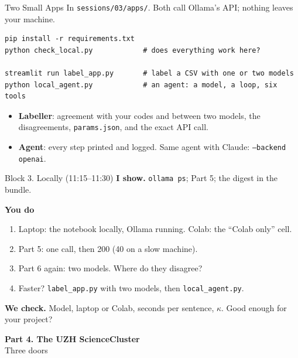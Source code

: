 \documentclass[svgnames,x11names,dvipsnames]{beamer}
\newcommand{\chg}[1]{{\bfseries #1}}
\renewcommand{\chg}[1]{#1}
\newcommand{\sectionslide}[2]{%
\begin{frame}[plain]
  \centering
  \vfill
  {\LARGE \textbf{\textcolor{titleblue}{#1}}}\\[0.4cm]
  {#2}
  \vfill
\end{frame}}
\begin{document}
\begin{frame}[fragile]{\chg{Two Small Apps}}
\small
In \texttt{sessions/03/apps/}. Both call Ollama's API; nothing leaves your machine.

\vspace{0.3cm}
{\scriptsize
\begin{verbatim}
pip install -r requirements.txt
python check_local.py            # does everything work here?

streamlit run label_app.py       # label a CSV with one or two models
python local_agent.py            # an agent: a model, a loop, six tools
\end{verbatim}}

\vspace{0.2cm}
\begin{itemize}
    \setlength{\itemsep}{4pt}
    \item \textbf{Labeller}: agreement with your codes and between two models, the disagreements, \texttt{params.json}, and the exact API call.
    \item \textbf{Agent}: every step printed and logged. Same agent with Claude: \texttt{--backend openai}.
\end{itemize}
\end{frame}

\begin{frame}{Block 3. Locally \chg{(11:15--11:30)}}
\small
\textbf{I show.} \texttt{ollama ps}; Part 5; the digest in the bundle.

\vspace{0.4cm}
\textbf{You do}
\begin{enumerate}
    \setlength{\itemsep}{4pt}
    \item Laptop: the notebook locally, Ollama running. Colab: the ``Colab only'' cell.
    \item Part 5: one call, then 200 (40 on a slow machine).
    \item Part 6 again: two models. Where do they disagree?
    \item \chg{Faster? \texttt{label\_app.py} with two models, then \texttt{local\_agent.py}.}
\end{enumerate}

\vspace{0.4cm}
\textbf{We check.} Model, laptop or Colab, seconds per sentence, $\kappa$. Good enough for your project?
\end{frame}

\sectionslide{Part 4. The UZH ScienceCluster}{Three doors}
\end{document}
